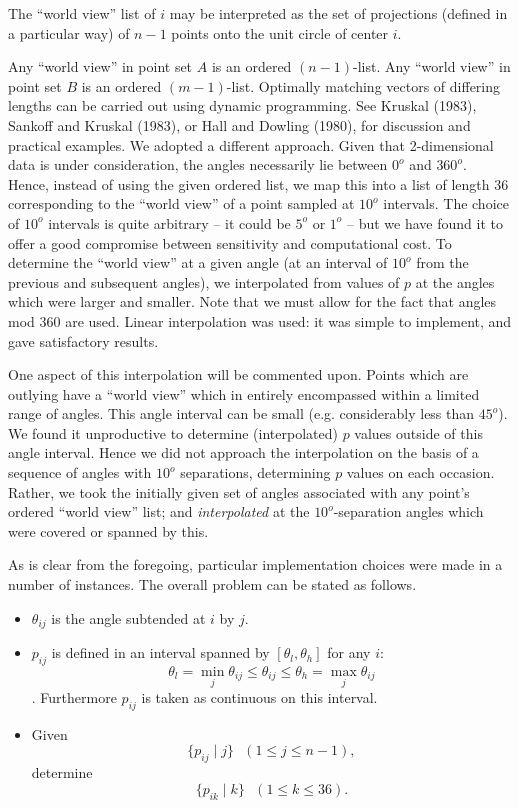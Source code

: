The ``world view'' list of $i$ may be interpreted as the set of projections
(defined in a particular way) of $n-1$ points onto the unit circle of center
$i$.

Any ``world view'' in point set $A$ is an ordered $(n-1)$-list.  Any ``world
view'' in point set $B$ is an ordered $(m-1)$-list.  Optimally matching
vectors of differing lengths can be carried out using dynamic programming.
See Kruskal (1983), Sankoff and Kruskal (1983), or Hall
and Dowling (1980), for discussion and practical examples.  We adopted a
different approach.  Given that 2-dimensional data is under consideration,
the angles necessarily lie between $0^o$ and $360^o$.  Hence, instead of 
using the given ordered list, we map this into a list of length 36
corresponding to the ``world view'' of a point sampled at $10^o$ intervals.
The choice of $10^o$ intervals is quite arbitrary -- it could be $5^o$ or
$1^o$ -- but we have found it to offer a good compromise between 
sensitivity and computational cost.  To determine the ``world view'' at 
a given angle (at an interval of $10^o$ from the previous and subsequent
angles), we interpolated from values of $p$ at the angles which were larger
and smaller.  Note that we must allow for the fact that angles mod $360$ are 
used.  Linear interpolation was used: it was simple to 
implement, and gave satisfactory results.   
 
One aspect of this interpolation will be commented upon.  Points which are
outlying have a ``world view'' which in entirely encompassed within a 
limited range of angles.  This angle interval can be small (e.g. considerably
less than $45^o$).  We found it unproductive to determine (interpolated)
$p$ values outside of this angle interval.  Hence we did not approach the
interpolation on the basis of a sequence of angles with $10^o$ separations,
determining $p$ values on each occasion.  Rather, we took the initially
given set of angles associated with any point's ordered ``world view''
list; and {\it interpolated} at the $10^o$-separation angles which were
covered or spanned by this.  

As is clear from the foregoing, particular implementation choices were made
in a number of instances.  The overall problem can be stated as follows.

\begin{itemize}

\item $ \theta_{ij} $ is the angle subtended at $i$ by $j$.

\item $ p_{ij} $ is defined in an interval spanned by $[\theta_l, 
\theta_h]$
for any $i$: $$ \theta_l = \min_j \theta_{ij} \leq 
\theta_{ij} \leq \theta_h = \max_j \theta_{ij}   $$.
Furthermore $p_{ij}$ is taken as continuous on this interval.

\item Given $$\{ p_{ij} \mid j \} \ \ \ (1 \leq j \leq n-1) , $$ 
determine $$\{ p_{ik} \mid k \} \ \ \  (1 \leq k \leq 36) . $$

\end{itemize}

